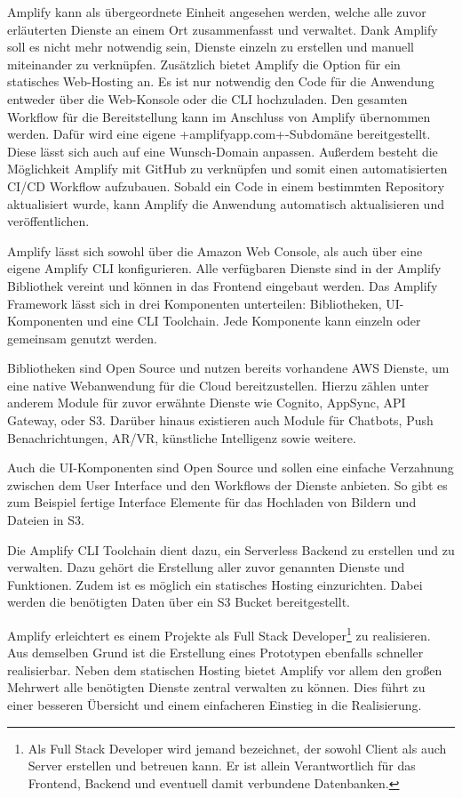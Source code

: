 {Amplify kann als übergeordnete Einheit angesehen werden, welche alle zuvor erläuterten Dienste an einem Ort zusammenfasst und verwaltet.
Dank Amplify soll es nicht mehr notwendig sein, Dienste einzeln zu erstellen und manuell miteinander zu verknüpfen.
Zusätzlich bietet Amplify die Option für ein statisches Web-Hosting an.
Es ist nur notwendig den Code für die Anwendung entweder über die Web-Konsole oder die CLI hochzuladen.
Den gesamten Workflow für die Bereitstellung kann im Anschluss von Amplify übernommen werden.
Dafür wird eine eigene \spverb+amplifyapp.com+-Subdomäne bereitgestellt.
Diese lässt sich auch auf eine Wunsch-Domain anpassen.
Außerdem besteht die Möglichkeit Amplify mit GitHub zu verknüpfen und somit einen automatisierten CI/CD Workflow aufzubauen.
Sobald ein Code in einem bestimmten Repository aktualisiert wurde, kann Amplify die Anwendung automatisch aktualisieren und veröffentlichen.
 \cite{AmplifyHosting}

Amplify lässt sich sowohl über die Amazon Web Console, als auch über eine eigene Amplify CLI konfigurieren.
Alle verfügbaren Dienste sind in der Amplify Bibliothek vereint und können in das Frontend eingebaut werden.
Das Amplify Framework lässt sich in drei Komponenten unterteilen: Bibliotheken, UI-Komponenten und eine CLI Toolchain.
Jede Komponente kann einzeln oder gemeinsam genutzt werden.

Bibliotheken sind Open Source und nutzen bereits vorhandene AWS Dienste, um eine native Webanwendung für die Cloud bereitzustellen.
Hierzu zählen unter anderem Module für zuvor erwähnte Dienste wie Cognito, AppSync, API Gateway, oder S3.
Darüber hinaus existieren auch Module für Chatbots, Push Benachrichtungen, AR/VR, künstliche Intelligenz sowie weitere.

Auch die UI-Komponenten sind Open Source und sollen eine einfache Verzahnung zwischen dem User Interface und den Workflows der Dienste anbieten.
So gibt es zum Beispiel fertige Interface Elemente für das Hochladen von Bildern und Dateien in S3.

Die Amplify CLI Toolchain dient dazu, ein Serverless Backend zu erstellen und zu verwalten.
Dazu gehört die Erstellung aller zuvor genannten Dienste und Funktionen.
Zudem ist es möglich ein statisches Hosting einzurichten.
Dabei werden die benötigten Daten über ein S3 Bucket bereitgestellt.

Amplify erleichtert es einem Projekte als Full Stack Developer\footnote{Als Full Stack Developer wird jemand bezeichnet, der sowohl Client als auch Server
erstellen und betreuen kann. Er ist allein Verantwortlich für das Frontend, Backend und eventuell damit verbundene Datenbanken.} zu realisieren.
Aus demselben Grund ist die Erstellung eines Prototypen ebenfalls schneller realisierbar.
Neben dem statischen Hosting bietet Amplify vor allem den großen Mehrwert alle benötigten Dienste zentral verwalten zu können.
Dies führt zu einer besseren Übersicht und einem einfacheren Einstieg in die Realisierung.
 \cite{AWSAmplifyKomponenten}


}
